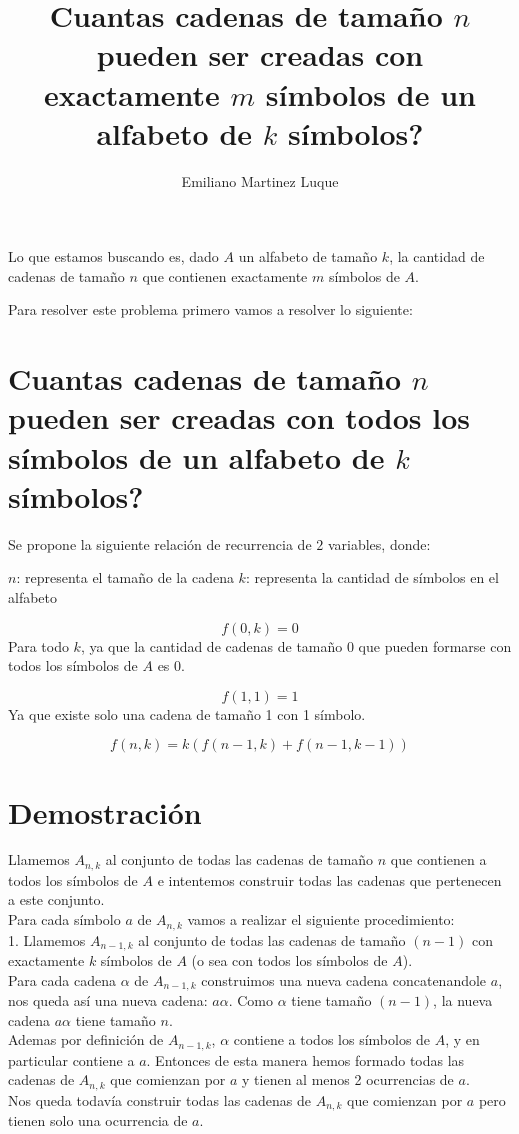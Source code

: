 \documentclass{amsart}
\author{ Emiliano Martinez Luque 
}
\title{ Cuantas cadenas de tamaño $n$ pueden ser creadas con exactamente $m$ símbolos de un alfabeto de $k$ símbolos?  }
\begin{document}
\maketitle

Lo que estamos buscando es, dado $A$ un alfabeto de tamaño $k$, la cantidad de cadenas de tamaño $n$ que contienen exactamente $m$ símbolos de $A$.

Para resolver este problema primero vamos a resolver lo siguiente:

\section{ Cuantas cadenas de tamaño $n$ pueden ser creadas con todos los símbolos de un alfabeto de $k$ símbolos? }

Se propone la siguiente relación de recurrencia de $2$ variables, donde:

$n$: representa el tamaño de la cadena
$k$: representa la cantidad de símbolos en el alfabeto

\begin{equation}
f(0, k) = 0
\end{equation}
Para todo $k$, ya que la cantidad de cadenas de tamaño 0 que pueden formarse con todos los símbolos de $A$ es 0.

\begin{equation}
f(1, 1) = 1  
\end{equation}
Ya que existe solo una cadena de tamaño 1 con 1 símbolo.

\begin{equation}
f(n, k) = k( f(n-1,k) + f(n-1, k-1) )  
\end{equation}

\section{ Demostración }

Llamemos $A_{n,k}$ al conjunto de todas las cadenas de tamaño $n$ que contienen a todos los símbolos de $A$ e intentemos construir todas las cadenas que pertenecen a este conjunto.\\

Para cada símbolo $a$ de $A_{n,k}$ vamos a realizar el siguiente procedimiento:\\

1. Llamemos $A_{n-1, k}$ al conjunto de todas las cadenas de tamaño $(n-1)$ con exactamente $k$ símbolos de $A$ (o sea con todos los símbolos de $A$).\\
Para cada cadena $\alpha$ de $A_{n-1, k}$ construimos una nueva cadena concatenandole $a$, nos queda así una nueva cadena: $a\alpha$. Como $\alpha$ tiene tamaño $(n-1)$, la nueva cadena $a\alpha$ tiene tamaño $n$.\\
Ademas por definición de $A_{n-1, k}$, $\alpha$ contiene a todos los símbolos de $A$, y en particular contiene a $a$. Entonces de esta manera hemos formado todas las cadenas de $A_{n,k}$ que comienzan por $a$ y tienen al menos 2 ocurrencias de $a$.\\
Nos queda todavía construir todas las cadenas de $A_{n,k}$ que comienzan por $a$ pero tienen solo una ocurrencia de $a$.\\ 
\end{document}
